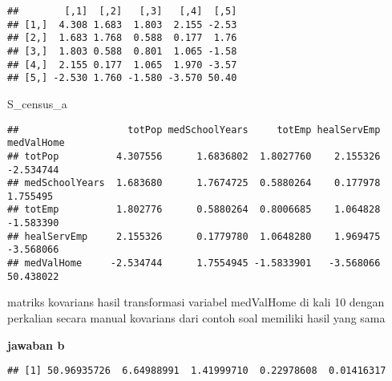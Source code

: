 \documentclass[
]{article}
\newenvironment{Shaded}{\begin{snugshade}}{\end{snugshade}}
\newcommand{\FunctionTok}[1]{\textcolor[rgb]{0.00,0.00,0.00}{#1}}
\newcommand{\NormalTok}[1]{#1}
\newcommand{\OtherTok}[1]{\textcolor[rgb]{0.56,0.35,0.01}{#1}}
\newcommand{\SpecialCharTok}[1]{\textcolor[rgb]{0.00,0.00,0.00}{#1}}
\begin{document}
\begin{verbatim}
##        [,1]  [,2]   [,3]   [,4]  [,5]
## [1,]  4.308 1.683  1.803  2.155 -2.53
## [2,]  1.683 1.768  0.588  0.177  1.76
## [3,]  1.803 0.588  0.801  1.065 -1.58
## [4,]  2.155 0.177  1.065  1.970 -3.57
## [5,] -2.530 1.760 -1.580 -3.570 50.40
\end{verbatim}

\begin{Shaded}
\begin{Highlighting}[]
\NormalTok{S\_census\_a}
\end{Highlighting}
\end{Shaded}

\begin{verbatim}
##                   totPop medSchoolYears     totEmp healServEmp medValHome
## totPop          4.307556      1.6836802  1.8027760    2.155326  -2.534744
## medSchoolYears  1.683680      1.7674725  0.5880264    0.177978   1.755495
## totEmp          1.802776      0.5880264  0.8006685    1.064828  -1.583390
## healServEmp     2.155326      0.1779780  1.0648280    1.969475  -3.568066
## medValHome     -2.534744      1.7554945 -1.5833901   -3.568066  50.438022
\end{verbatim}

matriks kovarians hasil transformasi variabel medValHome di kali 10
dengan perkalian secara manual kovarians dari contoh soal memiliki hasil
yang sama

\textbf{jawaban b}

\begin{Shaded}
\end{Shaded}

\begin{verbatim}
## [1] 50.96935726  6.64988991  1.41999710  0.22978608  0.01416317
\end{verbatim}

\begin{Shaded}
\end{Shaded}
\end{document}
